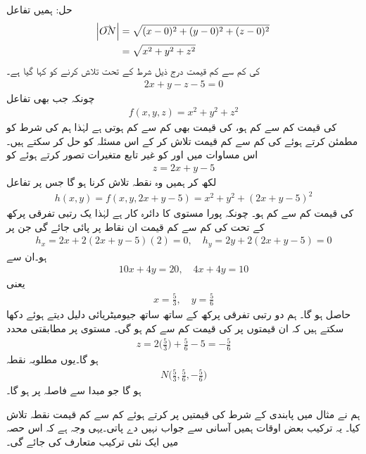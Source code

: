 حل:\quad
ہمیں  تفاعل 
\begin{align*}
\abs{\krightharpoonup{ON}}&=\sqrt{(x-0)^2+(y-0)^2+(z-0)^2}\\
&=\sqrt{x^2+y^2+z^2}
\end{align*}
کی کم سے کم قیمت درج ذیل شرط  کے تحت    تلاش کرنے کو کہا گیا ہے۔
\begin{align*}
2x+y-z-5=0
\end{align*}
چونکہ  جب بھی تفاعل
\begin{align*}
f(x,y,z)=x^2+y^2+z^2
\end{align*}
کی قیمت کم سے کم ہو،  کی قیمت بھی کم سے کم ہوتی ہے لہٰذا  ہم   کی شرط کو مطمئن کرتے   ہوئے  کی کم سے کم قیمت تلاش کر کے  اس مسئلہ کو  حل کر سکتے ہیں۔   اس مساوات میں  اور  کو غیر تابع متغیرات تصور کرتے ہوئے   کو
\begin{align*}
z=2x+y-5
\end{align*}
لکھ کر ہمیں وہ نقطہ  تلاش کرنا ہو گا جس پر تفاعل
\begin{align*}
h(x,y)=f(x,y,2x+y-5)=x^2+y^2+(2x+y-5)^2
\end{align*}
کی قیمت کم سے کم ہو۔ چونکہ پورا  مستوی  کا دائرہ کار ہے لہٰذا  یک رتبی تفرقی پرکھ کے تحت  کی کم سے کم قیمت ان نقاط پر پائی جائے گی جن پر
\begin{align*}
h_x=2x+2(2x+y-5)(2)=0,\quad h_y=2y+2(2x+y-5)=0
\end{align*}
ہو۔ان سے
\begin{align*}
10x+4y=20,\quad 4x+4y=10
\end{align*}
یعنی
\begin{align*}
x=\frac{5}{3},\quad y=\frac{5}{6}
\end{align*}
حاصل ہو گا۔ ہم دو رتبی تفرقی پرکھ کے ساتھ ساتھ جیومیٹریائی دلیل  دیتے ہوئے  دکھا سکتے ہیں کہ ان قیمتوں پر  کی قیمت کم سے کم ہو گی۔ مستوی  پر مطابقتی  محدد
\begin{align*}
z=2\big(\frac{5}{3}\big)+\frac{5}{6}-5=-\frac{5}{6}
\end{align*}
ہو گا۔یوں  مطلوبہ  نقطہ
\begin{align*}
N\big(\frac{5}{3},\frac{5}{6},-\frac{5}{6}\big)
\end{align*}
ہو گا جو مبدا سے  فاصلہ  پر ہو گا۔

ہم نے  مثال  میں       پابندی کے شرط کی قیمتیں پر کرتے ہوئے کم سے کم قیمت نقطہ تلاش کیا۔ یہ ترکیب بعض اوقات ہمیں آسانی  سے  جواب نہیں دے پاتی۔یہی وجہ ہے کہ اس حصہ میں ایک  نئی ترکیب متعارف کی جائے گی۔


